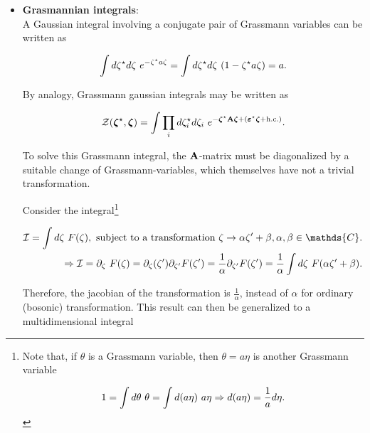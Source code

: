 \begin{itemize}
\item \textbf{Grasmannian integrals}:\\

A Gaussian integral involving a conjugate pair of Grassmann variables can be written as

$$
\int d\zeta^\star d\zeta \textnormal{ } e^{-\zeta^\star a \zeta} = \int d\zeta^\star d\zeta \textnormal{ } (1- \zeta^\star a \zeta) = a.
$$

By analogy, Grassmann gaussian integrals may be written as 

\begin{equation}
    \mathcal{Z}(\bm{\zeta}^\star,\bm{\zeta}) = \int \prod_{i} d{\zeta}_i^\star d{\zeta}_i \textnormal{ } e^{- \bm{\zeta}^\star {\bf A} \bm{\zeta} + (\bm{\varepsilon}^\star \bm{\zeta} + \textnormal{h.c.})}.
    \label{Grassmannian gaussian integral}
\end{equation}

To solve this Grassmann integral, the ${\bf A}$-matrix must be diagonalized by a suitable change of Grassmann-variables, which themselves have not a trivial transformation. 

\begin{tcolorbox}[colback=yellow!10!white,colframe=red!75!black,lowerbox=invisible, title = Transformation of Grassmann variables ]

Consider the integral\footnote{Note that, if $\theta$ is a Grassmann variable, then $\theta = a\eta$ is another Grassmann variable 

$$
1 = \int d\theta \textnormal{ } \theta = \int d(a \eta) \textnormal{ } a\eta \Rightarrow d(a \eta) = \frac{1}{a} d\eta.
$$}

\begin{equation}
    \begin{split}
        \mathcal{I} = \int d\zeta \blanky F(\zeta), \textnormal{ subject to a transformation } \zeta \rightarrow \alpha \zeta' + \beta, \alpha, \beta \in \mathds{C}. \\
        \Rightarrow \mathcal{I} = \partial_{\zeta} \blanky F(\zeta) = \partial_{\zeta} (\zeta') \partial_{\zeta'} F(\zeta') = \frac{1}{\alpha} \partial_{\zeta'} F(\zeta')  = \frac{1}{\alpha} \int d\zeta \blanky F(\alpha \zeta' + \beta).
    \end{split}
\end{equation}

Therefore, the jacobian of the transformation is $\frac{1}{\alpha}$, instead of $\alpha$ for ordinary (bosonic) transformation. This result can then be generalized to a multidimensional integral 


\end{tcolorbox}
\end{itemize}
